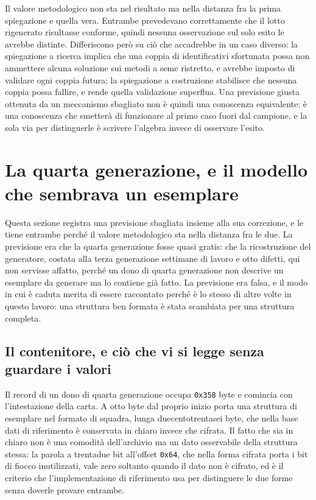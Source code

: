 Il valore metodologico non sta nel risultato ma nella distanza fra la prima spiegazione e quella vera. Entrambe prevedevano correttamente che il lotto rigenerato risultasse conforme, quindi nessuna osservazione sul solo esito le avrebbe distinte. Differiscono però su ciò che accadrebbe in un caso diverso: la spiegazione a ricerca implica che una coppia di identificativi sfortunata possa non ammettere alcuna soluzione sui metodi a seme ristretto, e avrebbe imposto di validare ogni coppia futura; la spiegazione a costruzione stabilisce che nessuna coppia possa fallire, e rende quella validazione superflua. Una previsione giusta ottenuta da un meccanismo sbagliato non è quindi una conoscenza equivalente: è una conoscenza che smetterà di funzionare al primo caso fuori dal campione, e la sola via per distinguerle è scrivere l'algebra invece di osservare l'esito.

\section{La quarta generazione, e il modello che sembrava un esemplare}
\label{sec:gen4-modello}

Questa sezione registra una previsione sbagliata insieme alla sua correzione, e le tiene entrambe perché il valore metodologico sta nella distanza fra le due. La previsione era che la quarta generazione fosse quasi gratis: che la ricostruzione del generatore, costata alla terza generazione settimane di lavoro e otto difetti, qui non servisse affatto, perché un dono di quarta generazione non descrive un esemplare da generare ma lo contiene già fatto. La previsione era falsa, e il modo in cui è caduta merita di essere raccontato perché è lo stesso di altre volte in questo lavoro: una struttura ben formata è stata scambiata per una struttura completa.

\subsection{Il contenitore, e ciò che vi si legge senza guardare i valori}

Il record di un dono di quarta generazione occupa \texttt{0x358} byte e comincia con l'intestazione della carta. A otto byte dal proprio inizio porta una struttura di esemplare nel formato di squadra, lunga duecentotrentasei byte, che nella base dati di riferimento è conservata in chiaro invece che cifrata. Il fatto che sia in chiaro non è una comodità dell'archivio ma un dato osservabile della struttura stessa: la parola a trentadue bit all'offset \texttt{0x64}, che nella forma cifrata porta i bit di fiocco inutilizzati, vale zero soltanto quando il dato non è cifrato, ed è il criterio che l'implementazione di riferimento usa per distinguere le due forme senza doverle provare entrambe.

